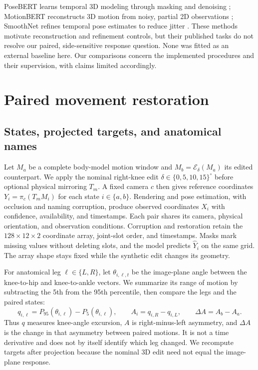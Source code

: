\documentclass{article}
\newcommand{\dg}{^{\circ}}
\begin{document}
PoseBERT learns temporal 3D modeling through masking and denoising \citep{baradel2022posebert}; MotionBERT reconstructs 3D motion from noisy, partial 2D observations \citep{zhu2023motionbert}; SmoothNet refines temporal pose estimates to reduce jitter \citep{zeng2022smoothnet}. These methods motivate reconstruction and refinement controls, but their published tasks do not resolve our paired, side-sensitive response question. None was fitted as an external baseline here. Our comparisons concern the implemented procedures and their supervision, with claims limited accordingly.

\section{Paired movement restoration}
\subsection{States, projected targets, and anatomical names}
Let $M_a$ be a complete body-model motion window and $M_b=\mathcal E_\delta(M_a)$ its edited counterpart. We apply the nominal right-knee edit $\delta\in\{0,5,10,15\}\dg$ before optional physical mirroring $T_m$. A fixed camera $c$ then gives reference coordinates $Y_i=\pi_c(T_mM_i)$ for each state $i\in\{a,b\}$. Rendering and pose estimation, with occlusion and naming corruption, produce observed coordinates $X_i$ with confidence, availability, and timestamps. Each pair shares its camera, physical orientation, and observation conditions. Corruption and restoration retain the $128\times12\times2$ coordinate array, joint-slot order, and timestamps. Masks mark missing values without deleting slots, and the model predicts $\widehat Y_i$ on the same grid. The array shape stays fixed while the synthetic edit changes its geometry.

For anatomical leg $\ell\in\{L,R\}$, let $\theta_{i,\ell,t}$ be the image-plane angle between the knee-to-hip and knee-to-ankle vectors. We summarize its range of motion by subtracting the 5th from the 95th percentile, then compare the legs and the paired states:
\begin{equation}
q_{i,\ell}=P_{95}(\theta_{i,\ell})-P_5(\theta_{i,\ell}),\qquad
A_i=q_{i,R}-q_{i,L},\qquad \Delta A=A_b-A_a.
\label{eq:measurement}
\end{equation}
Thus $q$ measures knee-angle excursion, $A$ is right-minus-left asymmetry, and $\Delta A$ is the change in that asymmetry between paired motions. It is not a time derivative and does not by itself identify which leg changed. We recompute targets after projection because the nominal 3D edit need not equal the image-plane response.
\end{document}
